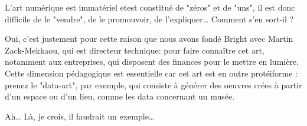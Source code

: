 \begin{His}
L'art numérique est immatériel  etest constitué de "zéros" et de "uns", il est donc difficile de le "vendre", de le promouvoir, de l'expliquer… Comment s'en sort-il ?

Oui, c'est justement pour cette raison que nous avons fondé Bright avec Martin Zack-Mekkaou, qui est directeur technique: pour faire connaître cet art, notamment aux entreprises, qui disposent des finances pour le mettre en lumière. Cette dimension pédagogique est essentielle car cet art est en outre protéiforme : prenez le "data-art", par exemple, qui consiste à générer des oeuvres crées à partir d'un espace ou d'un lieu, comme les data concernant un musée.

Ah… Là, je crois, il faudrait un exemple…

\end{His}